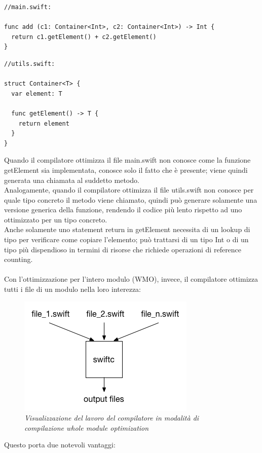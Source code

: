 \begin{lstlisting}
//main.swift:

func add (c1: Container<Int>, c2: Container<Int>) -> Int {
  return c1.getElement() + c2.getElement()
}
\end{lstlisting}
\begin{lstlisting}
//utils.swift:

struct Container<T> {
  var element: T

  func getElement() -> T {
    return element
  }
}
\end{lstlisting}
Quando il compilatore ottimizza il file main.swift non conosce come la funzione getElement sia implementata, conosce solo il fatto che è presente; viene quindi generata una chiamata al suddetto metodo.\\
Analogamente, quando il compilatore ottimizza il file utils.swift non conosce per quale tipo concreto il metodo viene chiamato, quindi può generare solamente una versione generica della funzione, rendendo il codice più lento rispetto ad uno ottimizzato per un tipo concreto.\\
Anche solamente uno statement return in getElement necessita di un lookup di tipo per verificare come copiare l'elemento; può trattarsi di un tipo Int o di un tipo più dispendioso in termini di risorse che richiede operazioni di reference counting.\\\\
Con l'ottimizzazione per l'intero modulo (WMO), invece, il compilatore ottimizza tutti i file di un modulo nella loro interezza: 
\begin{figure}[H]
      \centering
      \includegraphics[scale=0.80]{immagini/wmo.png}
            \vspace{0.8cm}
            \caption{\textit{Visualizzazione del lavoro del compilatore in modalità di compilazione whole module optimization}}
\end{figure}
Questo porta due notevoli vantaggi:\\
